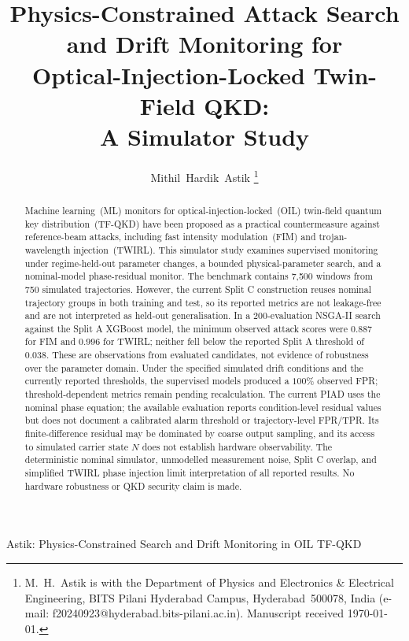 \documentclass[journal,twocolumn]{IEEEtran}
\begin{document}
\title{Physics-Constrained Attack Search and Drift Monitoring for\\
       Optical-Injection-Locked Twin-Field QKD:\\
       A Simulator Study}

\author{%
  Mithil~Hardik~Astik%
  \thanks{M.~H.~Astik is with the Department of Physics and Electronics \&
          Electrical Engineering, BITS Pilani Hyderabad Campus, Hyderabad~500078,
          India (e-mail: f20240923@hyderabad.bits-pilani.ac.in). Manuscript received
          \today.}%
}

%
         {Astik: Physics-Constrained Search and Drift Monitoring in OIL TF-QKD}

\maketitle

\begin{abstract}
Machine learning~(ML) monitors for optical-injection-locked~(OIL) twin-field
quantum key distribution~(TF-QKD) have been proposed as a practical countermeasure
against reference-beam attacks, including fast intensity modulation~(FIM) and
trojan-wavelength injection~(TWIRL). This simulator study examines supervised
monitoring under regime-held-out parameter changes, a bounded physical-parameter
search, and a nominal-model phase-residual monitor. The benchmark contains 7{,}500
windows from 750 simulated trajectories. However, the current Split C construction
reuses nominal trajectory groups in both training and test, so its reported metrics
are not leakage-free and are not interpreted as held-out generalisation. In a
200-evaluation NSGA-II search against the Split A XGBoost model, the minimum observed
attack scores were $0.887$ for FIM and $0.996$ for TWIRL; neither fell below the
reported Split A threshold of $0.038$. These are observations from evaluated
candidates, not evidence of robustness over the parameter domain. Under the specified
simulated drift conditions and the currently reported thresholds, the supervised
models produced a $100\%$ observed FPR; threshold-dependent metrics remain pending
recalculation.
The current PIAD uses the nominal phase equation; the available evaluation reports
condition-level residual values but does not document a calibrated alarm threshold
or trajectory-level FPR/TPR. Its finite-difference residual may be
dominated by coarse output sampling, and its access to simulated carrier state $N$
does not establish hardware observability. The deterministic nominal simulator,
unmodelled measurement noise, Split C overlap, and simplified TWIRL phase injection
limit interpretation of all reported results. No hardware robustness or QKD security
claim is made.
\end{abstract}
\end{document}
